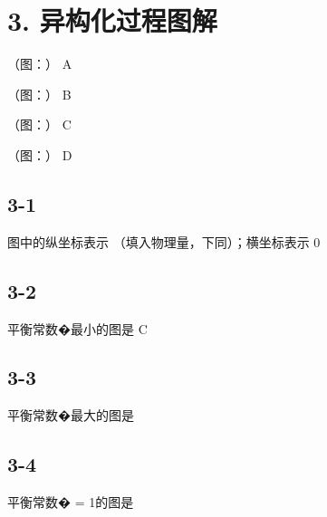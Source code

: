 \section*{3. 异构化过程图解}
（图：）
A

（图：）
B

（图：）
C

（图：）
D

\subsection*{3-1}
图中的纵坐标表⽰ （填⼊物理量，下同）；横坐标表⽰ 0

\subsection*{3-2}
平衡常数�最⼩的图是 C

\subsection*{3-3}
平衡常数�最⼤的图是

\subsection*{3-4}
平衡常数� = 1的图是
